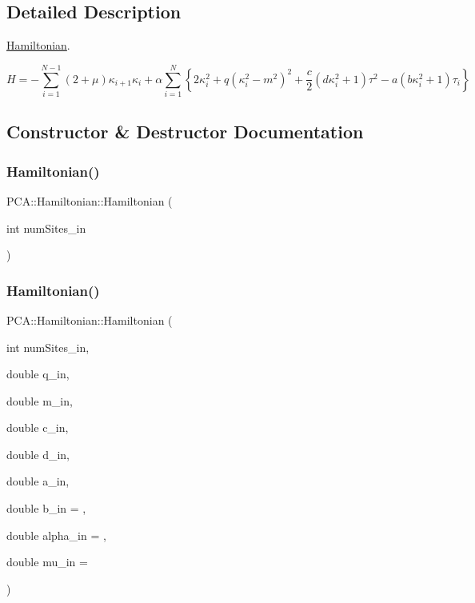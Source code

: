 \subsection{Detailed Description}
\hyperlink{class_p_c_a_1_1_hamiltonian}{Hamiltonian}. 

\[ H=-\sum_{i=1}^{N-1} (2+\mu)\kappa_{i+1} \kappa_i + \alpha\sum_{i=1}^{N} \left\{ 2\kappa_i ^2 + q ( \kappa_i^2-m^2)^2+ \frac{c}{2}(d \kappa_i^2+1) \tau^2-a(b\kappa_i^2+1)\tau_i\right\} \] 

\subsection{Constructor \& Destructor Documentation}
\hypertarget{class_p_c_a_1_1_hamiltonian_a3010d0e945bf871c22e57d530783c02a}{}\label{class_p_c_a_1_1_hamiltonian_a3010d0e945bf871c22e57d530783c02a} 
\subsubsection{\texorpdfstring{Hamiltonian()}{Hamiltonian()}\hspace{0.1cm}{\footnotesize\ttfamily [1/2]}}
{\footnotesize\ttfamily P\+C\+A\+::\+Hamiltonian\+::\+Hamiltonian (\begin{DoxyParamCaption}\item[{int}]{num\+Sites\+\_\+in }\end{DoxyParamCaption})}

\hypertarget{class_p_c_a_1_1_hamiltonian_ad2663a98cb52b4675ed01d6b911dd45a}{}\label{class_p_c_a_1_1_hamiltonian_ad2663a98cb52b4675ed01d6b911dd45a} 
\subsubsection{\texorpdfstring{Hamiltonian()}{Hamiltonian()}\hspace{0.1cm}{\footnotesize\ttfamily [2/2]}}
{\footnotesize\ttfamily P\+C\+A\+::\+Hamiltonian\+::\+Hamiltonian (\begin{DoxyParamCaption}\item[{int}]{num\+Sites\+\_\+in,  }\item[{double}]{q\+\_\+in,  }\item[{double}]{m\+\_\+in,  }\item[{double}]{c\+\_\+in,  }\item[{double}]{d\+\_\+in,  }\item[{double}]{a\+\_\+in,  }\item[{double}]{b\+\_\+in = {},  }\item[{double}]{alpha\+\_\+in = {},  }\item[{double}]{mu\+\_\+in = {} }\end{DoxyParamCaption})}




